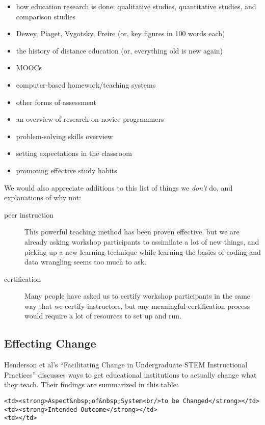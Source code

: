 \begin{itemize}
\item
  how education research is done: qualitative studies, quantitative
  studies, and comparison studies
\item
  Dewey, Piaget, Vygotsky, Freire (or, key figures in 100 words each)
\item
  the history of distance education (or, everything old is new again)
\item
  MOOCs
\item
  computer-based homework/teaching systems
\item
  other forms of assessment
\item
  an overview of research on novice programmers
\item
  problem-solving skills overview
\item
  setting expectations in the classroom
\item
  promoting effective study habits
\end{itemize}

We would also appreciate additions to this list of things we
\emph{don't} do, and explanations of why not:

\begin{description}
\item[peer instruction]
This powerful teaching method has been proven effective, but we are
already asking workshop participants to assimilate a lot of new things,
and picking up a new learning technique while learning the basics of
coding and data wrangling seems too much to ask.
\item[certification]
Many people have asked us to certify workshop participants in the same
way that we certify instructors, but any meaningful certification
process would require a lot of resources to set up and run.
\end{description}

\subsection{Effecting Change}\label{effecting-change}

Henderson et al's
``Facilitating Change in Undergraduate STEM Instructional Practices''
\cite{bib:henderson-facilitating}
discusses ways
to get educational institutions to actually change what they teach.
Their findings are summarized in this table:

\begin{verbatim}
<td><strong>Aspect&nbsp;of&nbsp;System<br/>to be Changed</strong></td>
<td><strong>Intended Outcome</strong></td>
<td></td>
\end{verbatim}

